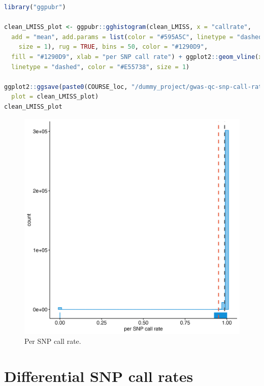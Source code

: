 \documentclass[
]{book}
\begin{document}
\begin{lstlisting}[language=R]
library("ggpubr")

clean_LMISS_plot <- ggpubr::gghistogram(clean_LMISS, x = "callrate",
  add = "mean", add.params = list(color = "#595A5C", linetype = "dashed",
    size = 1), rug = TRUE, bins = 50, color = "#1290D9",
  fill = "#1290D9", xlab = "per SNP call rate") + ggplot2::geom_vline(xintercept = 0.95,
  linetype = "dashed", color = "#E55738", size = 1)

ggplot2::ggsave(paste0(COURSE_loc, "/dummy_project/gwas-qc-snp-call-rate.png"),
  plot = clean_LMISS_plot)
clean_LMISS_plot
\end{lstlisting}

\begin{figure}[H]

{\centering \includegraphics[width=29.17in]{img/_gwas_dummy/show-snp-callrate} 

}

\caption{Per SNP call rate.}\label{fig:show-snp-callrate}
\end{figure}

\hypertarget{differential-snp-call-rates}{%
\section{Differential SNP call rates}\label{differential-snp-call-rates}}
\end{document}
